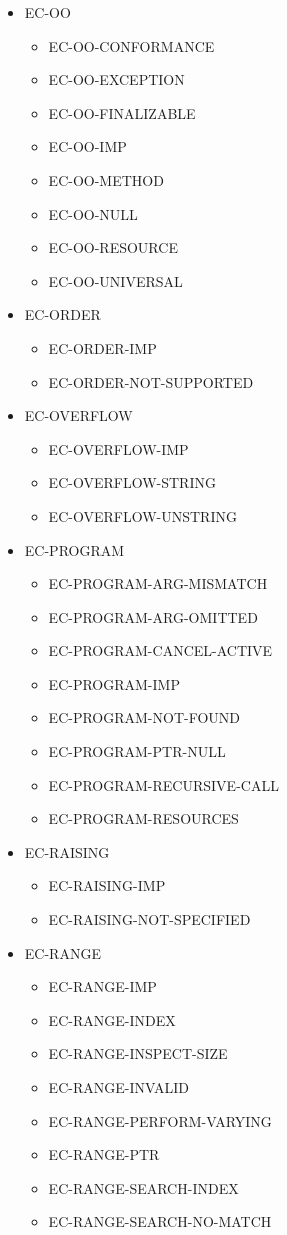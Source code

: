 \begin{itemize}
\item EC-OO
  \begin{itemize}
  \item EC-OO-CONFORMANCE
  \item EC-OO-EXCEPTION
  \item EC-OO-FINALIZABLE
  \item EC-OO-IMP
  \item EC-OO-METHOD
  \item EC-OO-NULL
  \item EC-OO-RESOURCE
  \item EC-OO-UNIVERSAL
  \end{itemize}

\item EC-ORDER
  \begin{itemize}
  \item EC-ORDER-IMP
  \item EC-ORDER-NOT-SUPPORTED
  \end{itemize}

\item EC-OVERFLOW
  \begin{itemize}
  \item EC-OVERFLOW-IMP
  \item EC-OVERFLOW-STRING
  \item EC-OVERFLOW-UNSTRING
  \end{itemize}

\item EC-PROGRAM
  \begin{itemize}
  \item EC-PROGRAM-ARG-MISMATCH
  \item EC-PROGRAM-ARG-OMITTED
  \item EC-PROGRAM-CANCEL-ACTIVE
  \item EC-PROGRAM-IMP
  \item EC-PROGRAM-NOT-FOUND
  \item EC-PROGRAM-PTR-NULL
  \item EC-PROGRAM-RECURSIVE-CALL
  \item EC-PROGRAM-RESOURCES
  \end{itemize}

\item EC-RAISING
  \begin{itemize}
  \item EC-RAISING-IMP
  \item EC-RAISING-NOT-SPECIFIED
  \end{itemize}

\item EC-RANGE
  \begin{itemize}
  \item EC-RANGE-IMP
  \item EC-RANGE-INDEX
  \item EC-RANGE-INSPECT-SIZE
  \item EC-RANGE-INVALID
  \item EC-RANGE-PERFORM-VARYING
  \item EC-RANGE-PTR
  \item EC-RANGE-SEARCH-INDEX
  \item EC-RANGE-SEARCH-NO-MATCH
  \end{itemize}


\end{itemize}
